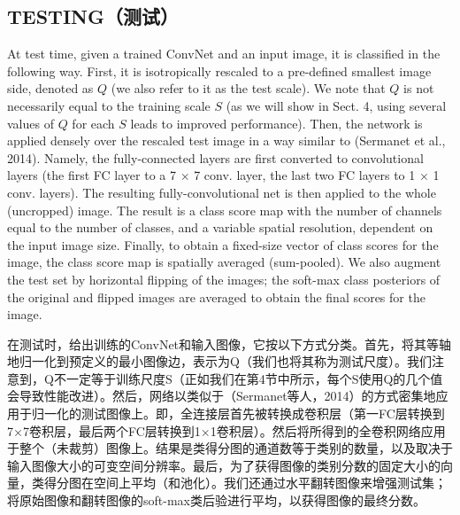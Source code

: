 \documentclass[12pt,a4paper,UTF8,twoside]{book}
\begin{document}
\hypertarget{testingux6d4bux8bd5}{%
\subsection{TESTING（测试）}\label{testingux6d4bux8bd5}}

At test time, given a trained ConvNet and an input image, it is classified in the following way. First, it is isotropically rescaled to a pre-defined smallest image side, denoted as \(Q\) (we also refer to it as the test scale). We note that \(Q\) is not necessarily equal to the training scale \(S\) (as we will show in Sect. 4, using several values of \(Q\) for each \(S\) leads to improved performance). Then, the network is applied densely over the rescaled test image in a way similar to (Sermanet et al., 2014). Namely, the fully-connected layers are first converted to convolutional layers (the first FC layer to a 7 × 7 conv. layer, the last two FC layers to 1 × 1 conv. layers). The resulting fully-convolutional net is then applied to the whole (uncropped) image. The result is a class score map with the number of channels equal to the number of classes, and a variable spatial resolution, dependent on the input image size. Finally, to obtain a fixed-size vector of class scores for the image, the class score map is spatially averaged (sum-pooled). We also augment the test set by horizontal flipping of the images; the soft-max class posteriors of the original and flipped images are averaged to obtain the final scores for the image.

在测试时，给出训练的ConvNet和输入图像，它按以下方式分类。首先，将其等轴地归一化到预定义的最小图像边，表示为Q（我们也将其称为测试尺度）。我们注意到，Q不一定等于训练尺度S（正如我们在第4节中所示，每个S使用Q的几个值会导致性能改进）。然后，网络以类似于（Sermanet等人，2014）的方式密集地应用于归一化的测试图像上。即，全连接层首先被转换成卷积层（第一FC层转换到7×7卷积层，最后两个FC层转换到1×1卷积层）。然后将所得到的全卷积网络应用于整个（未裁剪）图像上。结果是类得分图的通道数等于类别的数量，以及取决于输入图像大小的可变空间分辨率。最后，为了获得图像的类别分数的固定大小的向量，类得分图在空间上平均（和池化）。我们还通过水平翻转图像来增强测试集；将原始图像和翻转图像的soft-max类后验进行平均，以获得图像的最终分数。
\end{document}
